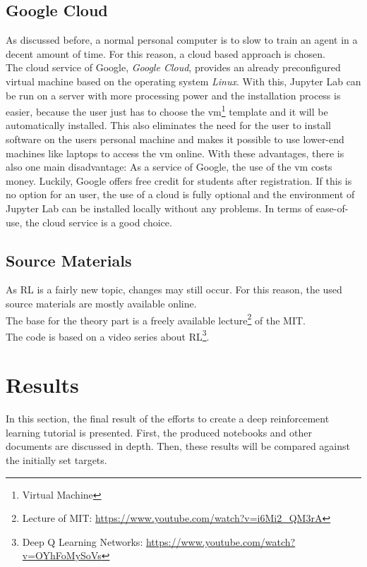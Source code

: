 \documentclass[10pt,a4paper]{article}
\begin{document}
		\subsection{Google Cloud}
		As discussed before, a normal personal computer is to slow to train an agent in a decent amount of time. For this reason, a cloud based approach is chosen.\\
		The cloud service of Google, \textit{Google Cloud}, provides an already preconfigured virtual machine based on the operating system \textit{Linux}.
		With this, Jupyter Lab can be run on a server with more processing power and the installation process is easier, because the user just has to choose the vm\footnote{Virtual Machine} template and it will be automatically installed. 
		This also eliminates the need for the user to install software on the users personal machine and makes it possible to use lower-end machines like laptops to access the vm online. 
		With these advantages, there is also one main disadvantage: As a service of Google, the use of the vm costs money. 
		Luckily, Google offers free credit for students after registration.
		If this is no option for an user, the use of a cloud is fully optional and the environment of Jupyter Lab can be installed locally without any problems. 
		In terms of ease-of-use, the cloud service is a good choice.
		
		\subsection{Source Materials}
		As RL is a fairly new topic, changes may still occur. For this reason, the used source materials are mostly available online.\\
		The base for the theory part is a freely available lecture\footnote{Lecture of MIT: \url{https://www.youtube.com/watch?v=i6Mi2_QM3rA}} of the MIT.\\
		The code is based on a video series about RL\footnote{Deep Q Learning Networks: \url{https://www.youtube.com/watch?v=OYhFoMySoVs}}.  
	
	\section{Results}
	 
	 In this section, the final result of the efforts to create a deep reinforcement learning tutorial is presented. 
	 First, the produced notebooks and other documents are discussed in depth.
	 Then, these results will be compared against the initially set targets.
	 
\end{document}
